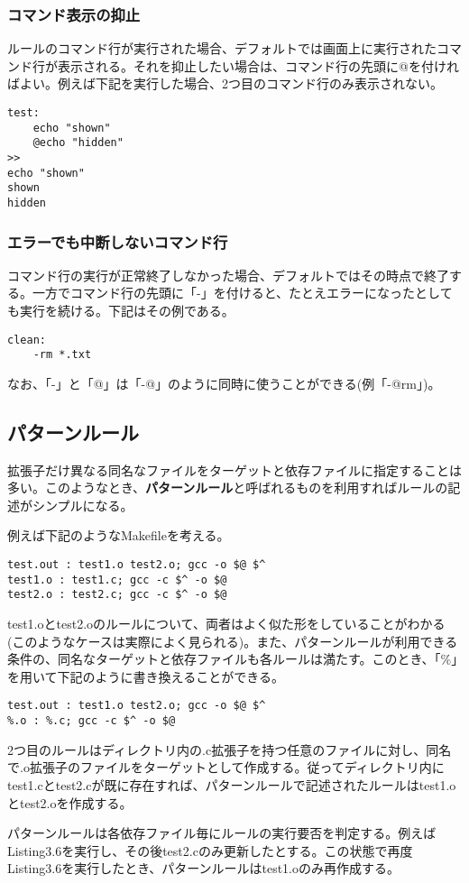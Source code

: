 \documentclass[dvipdfmx, 9pt, a4paper]{jsarticle}
\numberwithin{equation}{section}
\begin{document}
\subsubsection{コマンド表示の抑止}
ルールのコマンド行が実行された場合、デフォルトでは画面上に実行されたコマンド行が表示される。それを抑止したい場合は、コマンド行の先頭に@を付ければよい。例えば下記を実行した場合、2つ目のコマンド行のみ表示されない。
\begin{lstlisting}[caption=コマンド表示の抑止]
test:
	echo "shown"
	@echo "hidden"
>>
echo "shown"
shown
hidden
\end{lstlisting}
\subsubsection{エラーでも中断しないコマンド行}
コマンド行の実行が正常終了しなかった場合、デフォルトではその時点で終了する。一方でコマンド行の先頭に「-」を付けると、たとえエラーになったとしても実行を続ける。下記はその例である。
\begin{lstlisting}[caption=エラーでも中断しない例]
clean:
	-rm *.txt
\end{lstlisting}\par
なお、「-」と「@」は「-@」のように同時に使うことができる(例「-@rm」)。

\subsection{パターンルール}
拡張子だけ異なる同名なファイルをターゲットと依存ファイルに指定することは多い。このようなとき、{\bf パターンルール}と呼ばれるものを利用すればルールの記述がシンプルになる。\par
例えば下記のようなMakefileを考える。
\begin{lstlisting}[caption=Makefile(パターンルール前)]
test.out : test1.o test2.o; gcc -o $@ $^
test1.o : test1.c; gcc -c $^ -o $@
test2.o : test2.c; gcc -c $^ -o $@
\end{lstlisting}\par
test1.oとtest2.oのルールについて、両者はよく似た形をしていることがわかる(このようなケースは実際によく見られる)。また、パターンルールが利用できる条件の、同名なターゲットと依存ファイルも各ルールは満たす。このとき、「\%」を用いて下記のように書き換えることができる。
\begin{lstlisting}[caption=Makefile(パターンルール)]
test.out : test1.o test2.o; gcc -o $@ $^
%.o : %.c; gcc -c $^ -o $@
\end{lstlisting}\par
2つ目のルールはディレクトリ内の.c拡張子を持つ任意のファイルに対し、同名で.o拡張子のファイルをターゲットとして作成する。従ってディレクトリ内にtest1.cとtest2.cが既に存在すれば、パターンルールで記述されたルールはtest1.oとtest2.oを作成する。\par
パターンルールは各依存ファイル毎にルールの実行要否を判定する。例えばListing3.6を実行し、その後test2.cのみ更新したとする。この状態で再度Listing3.6を実行したとき、パターンルールはtest1.oのみ再作成する。
\end{document}
